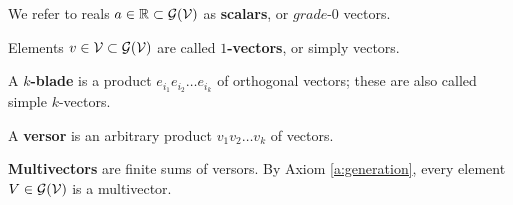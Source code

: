 \begin{definition}
	We refer to reals $a \in \mathbb{R} \subset \mathcal{G}(\mathcal{V})$ as \textbf{scalars}, or $\textit{grade-0}$ vectors.
\end{definition}
\begin{definition}
	Elements $v \in \mathcal{V} \subset \mathcal{G}(\mathcal{V})$ are called \textbf{$1$-vectors}, or simply vectors.
\end{definition}
\begin{definition} \label{d:k-blades}
	A \textbf{$k$-blade} is a product $e_{i_1}e_{i_2} \ldots e_{i_k}$ of orthogonal vectors; these are also called simple $k$-vectors.
\end{definition}
\begin{definition}
	A \textbf{versor} is an arbitrary product $v_1v_2 \ldots v_k$ of vectors.
\end{definition}
\begin{definition}
	\textbf{Multivectors} are finite sums of versors. By Axiom \ref{a:generation}, every element $V \in \mathcal{G}(\mathcal{V})$ is a multivector.
\end{definition}
